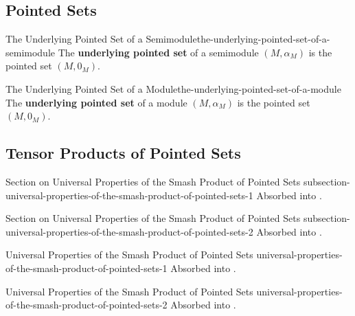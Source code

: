 \subsection{Pointed Sets}\label{subsection-retired-tags-pointed-sets}
\begin{oldtag}{The Underlying Pointed Set of a Semimodule}{the-underlying-pointed-set-of-a-semimodule}%
    The \textbf{underlying pointed set} of a semimodule $(M,\alpha_{M})$ is the pointed set $(M,0_{M})$.
\end{oldtag}
\begin{oldtag}{The Underlying Pointed Set of a Module}{the-underlying-pointed-set-of-a-module}%
    The \textbf{underlying pointed set} of a module $(M,\alpha_{M})$ is the pointed set $(M,0_{M})$.
\end{oldtag}
\subsection{Tensor Products of Pointed Sets}\label{section-tensor-products-of-pointed-sets}
\begin{oldtag}{Section on Universal Properties of the Smash Product of Pointed Sets \rmI}{subsection-universal-properties-of-the-smash-product-of-pointed-sets-1}%
    Absorbed into .
\end{oldtag}
\begin{oldtag}{Section on Universal Properties of the Smash Product of Pointed Sets \rmII}{subsection-universal-properties-of-the-smash-product-of-pointed-sets-2}%
    Absorbed into .
\end{oldtag}
\begin{oldtag}{Universal Properties of the Smash Product of Pointed Sets \rmI}{universal-properties-of-the-smash-product-of-pointed-sets-1}%
    Absorbed into .
\end{oldtag}
\begin{oldtag}{Universal Properties of the Smash Product of Pointed Sets \rmII}{universal-properties-of-the-smash-product-of-pointed-sets-2}%
    Absorbed into .
\end{oldtag}
